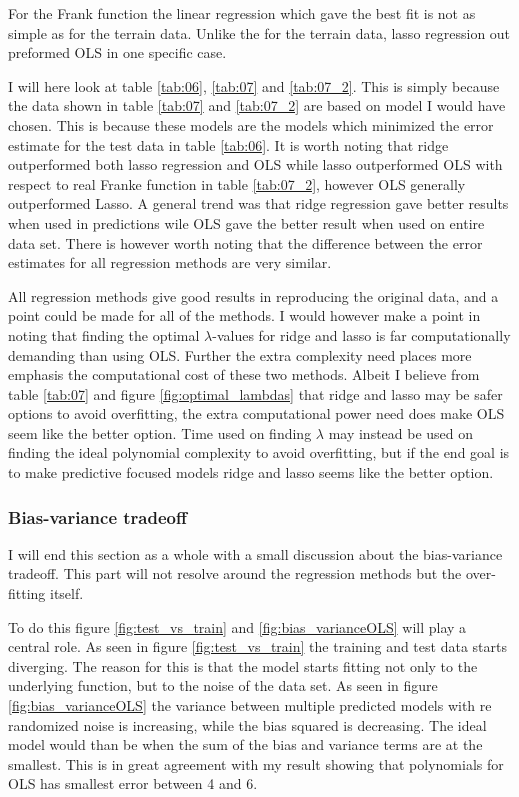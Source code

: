 \documentclass[uio,jmp,amsmath,amssymb,reprint,nofootinbib]{revtex4-1}
\numberwithin{equation}{section}
\begin{document}
For the Frank function the linear regression which gave the best fit is not as simple as for the terrain data. Unlike the for the terrain data, lasso regression out preformed OLS in one specific case.

I will here look at table \ref{tab:06}, \ref{tab:07} and \ref{tab:07_2}. This is simply because the data shown in table \ref{tab:07} and \ref{tab:07_2} are based on model I would have chosen. This is because these models are the models which minimized the error estimate for the test data in table \ref{tab:06}. It is worth noting that ridge outperformed both lasso regression and OLS while lasso outperformed OLS with respect to real Franke function in table \ref{tab:07_2}, however OLS generally outperformed Lasso. A general trend was that ridge regression gave better results when used in predictions wile OLS gave the better result when used on entire data set. There is however worth noting that the difference between the error estimates for all regression methods are very similar.

All regression methods give good results in reproducing the original data, and a point could be made for all of the methods. I would however make a point in noting that finding the optimal \(\lambda\)-values for ridge and lasso is far computationally demanding than using OLS. Further the extra complexity need places more emphasis the computational cost of these two methods. Albeit I believe from table \ref{tab:07} and figure \ref{fig:optimal_lambdas} that ridge and lasso may be safer options to avoid overfitting, the extra computational power need does make OLS seem like the better option. Time used on finding \(\lambda\) may instead be used on finding the ideal polynomial complexity to avoid overfitting, but if the end goal is to make predictive focused models ridge and lasso seems like the better option.

\subsubsection{Bias-variance tradeoff}

I will end this section as a whole with a small discussion about the bias-variance tradeoff. This part will not resolve around the regression methods but the over-fitting itself.

To do this figure \ref{fig:test_vs_train} and \ref{fig:bias_varianceOLS} will play a central role. As seen in figure \ref{fig:test_vs_train} the training and test data starts diverging. The reason for this is that the model starts fitting not only to the underlying function, but to the noise of the data set. As seen in figure \ref{fig:bias_varianceOLS} the variance between multiple predicted models with re randomized noise is increasing, while the bias squared is decreasing. The ideal model would than be when the sum of the bias and variance terms are at the smallest. This is in great agreement with my result showing that polynomials for OLS has smallest error between 4 and 6.
\end{document}

